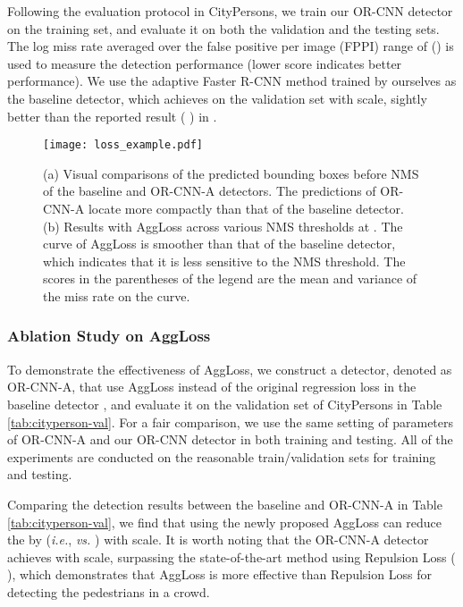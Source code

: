 \documentclass[runningheads]{llncs}
\def\ie{{\em i.e.}}
\begin{document}
Following the evaluation protocol in CityPersons, we train our OR-CNN detector on the training set, and evaluate it on both the validation and the testing sets. The log miss rate averaged over the false positive per image (FPPI) range of  () is used to measure the detection performance (lower score indicates better performance). We use the adaptive Faster R-CNN method \cite{DBLP:conf/cvpr/ZhangBS17} trained by ourselves as the baseline detector, which achieves   on the validation set with  scale, sightly better than the reported result ( ) in \cite{DBLP:conf/cvpr/ZhangBS17}.


\begin{figure*}[t]
\centering
\texttt{[image: loss\_example.pdf]}
\caption{(a) Visual comparisons of the predicted bounding boxes before NMS of the baseline and OR-CNN-A detectors. The predictions of OR-CNN-A locate more compactly than that of the baseline detector. (b) Results with AggLoss across various NMS thresholds at . The curve of AggLoss is smoother than that of the baseline detector, which indicates that it is less sensitive to the NMS threshold. The scores in the parentheses of the legend are the mean and variance of the miss rate on the curve.}
\label{fig:loss_example}
\end{figure*}


\subsubsection{Ablation Study on AggLoss}

To demonstrate the effectiveness of AggLoss, we construct a detector, denoted as OR-CNN-A, that use AggLoss instead of the original regression loss in the baseline detector \cite{DBLP:conf/cvpr/ZhangBS17}, and evaluate it on the validation set of CityPersons in Table \ref{tab:cityperson-val}. For a fair comparison, we use the same setting of parameters of OR-CNN-A and our OR-CNN detector in both training and testing. All of the experiments are conducted on the reasonable train/validation sets for training and testing.

Comparing the detection results between the baseline and OR-CNN-A in Table \ref{tab:cityperson-val}, we find that using the newly proposed AggLoss can reduce the  by  (\ie,   {\em vs.}  ) with  scale. It is worth noting that the OR-CNN-A detector achieves   with  scale, surpassing the state-of-the-art method using Repulsion Loss \cite{DBLP:journals/corr/abs-1711-07752} ( ), which demonstrates that AggLoss is more effective than Repulsion Loss \cite{DBLP:journals/corr/abs-1711-07752} for detecting the pedestrians in a crowd.
\end{document}
